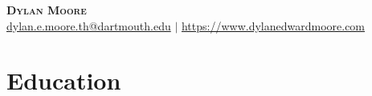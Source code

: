 \documentclass[letterpaper,11pt]{article}
\begin{document}

\begin{center}
    \textbf{\Huge \scshape {\textcolor[HTML]{417865}{Dylan Moore}}} \\ \vspace{1pt}
    \href{mailto:dylan.e.moore.th@dartmouth.edu}{dylan.e.moore.th@dartmouth.edu}  {\textcolor[HTML]{8AB8A7}{$|$}}  \url{https://www.dylanedwardmoore.com}

\end{center}


\section{Education}
\end{document}
